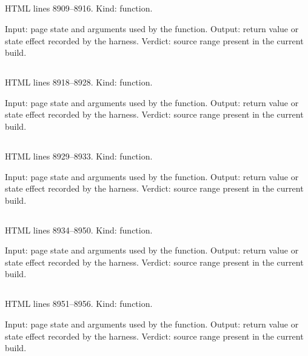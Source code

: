 \subsection*{\texttt{}}
\label{vf_485_setSelectItems}
HTML lines 8909--8916. Kind: function.

Input: page state and arguments used by the function.
Output: return value or state effect recorded by the harness.
Verdict: source range present in the current build.

\subsection*{\texttt{}}
\label{vf_486_analysisChoices}
HTML lines 8918--8928. Kind: function.

Input: page state and arguments used by the function.
Output: return value or state effect recorded by the harness.
Verdict: source range present in the current build.

\subsection*{\texttt{}}
\label{vf_487_selectedWells}
HTML lines 8929--8933. Kind: function.

Input: page state and arguments used by the function.
Output: return value or state effect recorded by the harness.
Verdict: source range present in the current build.

\subsection*{\texttt{}}
\label{vf_488_physicalCurveRows}
HTML lines 8934--8950. Kind: function.

Input: page state and arguments used by the function.
Output: return value or state effect recorded by the harness.
Verdict: source range present in the current build.

\subsection*{\texttt{}}
\label{vf_489_heatColour}
HTML lines 8951--8956. Kind: function.

Input: page state and arguments used by the function.
Output: return value or state effect recorded by the harness.
Verdict: source range present in the current build.

